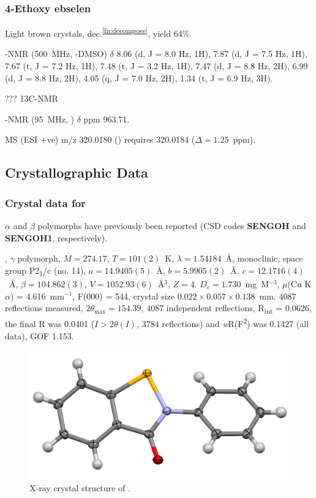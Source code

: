 \begin{refsection}
\subsubsection{4-Ethoxy ebselen }
Light brown crystals, dec.\textsuperscript{\ref{fn:decompose}}, yield 64\%.

-NMR (500~MHz, -DMSO) $ \delta $ 8.06 (d, J = 8.0 Hz, 1H), 7.87 (d, J = 7.5 Hz, 1H), 7.67 (t, J = 7.2 Hz, 1H), 7.48 (t, J = 3.2 Hz, 1H), 7.47 (d, J = 8.8 Hz, 2H), 6.99 (d, J = 8.8 Hz, 2H), 4.05 (q, J = 7.0 Hz, 2H), 1.34 (t, J = 6.9 Hz, 3H).

??? 13C-NMR

-NMR (95~MHz, ) $ \delta $ ppm 963.71.

MS (ESI +ve) m/z 320.0180 ()  requires 320.0184 ($ \Delta = 1.25$~ppm).


\subsection{Crystallographic Data}

\subsubsection{Crystal data for \texorpdfstring{}{C13 H9 N O Se}}
$\alpha$ and $\beta$ polymorphs have previously been reported (CSD codes \textbf{SENGOH} and \textbf{SENGOH1}, respectively).\autocite{Dupont1990StructuresII}

, $\gamma$ polymorph, $M=274.17$, $T=101(2)$~K, $\lambda=1.54184$~\AA, monoclinic, space group P2\textsubscript{1}/c (no. 14), $a = 14.9405(5)$~\AA, $b = 5.9905(2)$~\AA, $c = 12.1716(4)$~\AA, $\beta = 104.862(3)$\degree, $V = 1052.93(6)$~\AA$^{3}$, $Z = 4$. $D_{c}= 1.730$~mg~M$^{-3}$, $\mu$(Cu K$\alpha$) = 4.616~mm$^{-1}$, F(000) = 544, crystal size $0.022 \times 0.057 \times 0.138$~mm. 4087 reflections measured, $2\theta_{\max}=154.39$\degree, 4087 independent reflections, R\textsubscript{int} = 0.0626, the final R was 0.0401 ($I > 2\theta(I)$, 3784 reflections) and \textit{w}R(F\textsuperscript{2}) was 0.1427 (all data), GOF 1.153.

\begin{figure}
  \includegraphics[width=0.6\linewidth]{Figures/ebs-xtal.pdf}
  \caption{X-ray crystal structure of \texorpdfstring{}{C13 H9 N O Se}.}
\end{figure}


\end{refsection}
